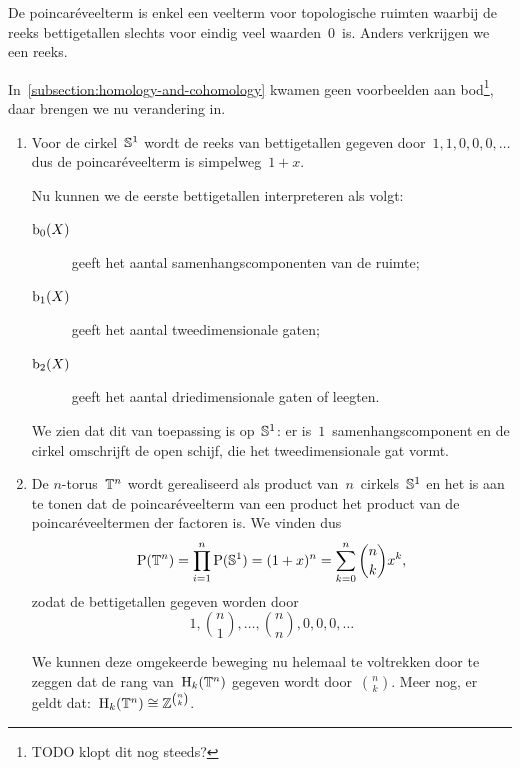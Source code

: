 \documentclass[a4paper,11pt,openany,oneside,article]{memoir}
\begin{document}
\begin{remark}
  De poincar\'eveelterm is enkel een veelterm voor topologische ruimten waarbij de reeks bettigetallen slechts voor eindig veel waarden~$0$~is. Anders verkrijgen we een reeks.
\end{remark}

In~\cref{subsection:homology-and-cohomology} kwamen geen voorbeelden aan bod\footnote{TODO klopt dit nog steeds?}, daar brengen we nu verandering in.
\begin{example}
  \label{example:betti-numbers}
  \begin{enumerate}
    \item Voor de cirkel~$\mathbb{S}^1$ wordt de reeks van bettigetallen gegeven door~$1,1,0,0,0,\ldots$ dus de poincar\'eveelterm is simpelweg~$1+x$.
      
      Nu kunnen we de eerste bettigetallen interpreteren als volgt:
      \begin{description}
        \item[$\mathrm{b}_0(X)$] geeft het aantal samenhangscomponenten van de ruimte;
        \item[$\mathrm{b}_1(X)$] geeft het aantal tweedimensionale gaten;
        \item[$\mathrm{b}_2(X)$] geeft het aantal driedimensionale gaten of leegten.
      \end{description}

      We zien dat dit van toepassing is op~$\mathbb{S}^1$: er is~$1$~samenhangscomponent en de cirkel omschrijft de open schijf, die het tweedimensionale gat vormt.

    \item De $n$\nobreakdash-torus~$\mathbb{T}^n$ wordt gerealiseerd als product van~$n$~cirkels~$\mathbb{S}^1$ en het is aan te tonen dat de poincar\'eveelterm van een product het product van de poincar\'eveeltermen der factoren is. We vinden dus
      \begin{equation}
        \mathrm{P}(\mathbb{T}^n)=\prod_{i=1}^n\mathrm{P}(\mathbb{S}^1)=(1+x)^n=\sum_{k=0}^n\binom{n}{k}x^k,
      \end{equation}
      zodat de bettigetallen gegeven worden door
      \begin{equation}
        1,\binom{n}{1},\ldots,\binom{n}{n},0,0,0,\ldots
      \end{equation}

      We kunnen deze omgekeerde beweging nu helemaal te voltrekken door te zeggen dat de rang van~$\mathrm{H}_k(\mathbb{T}^n)$ gegeven wordt door~$\binom{n}{k}$. Meer nog, er geldt dat:~$\mathrm{H}_k(\mathbb{T}^n)\cong\mathbb{Z}^{\binom{n}{k}}$.


\end{enumerate}
\end{example}
\end{document}
